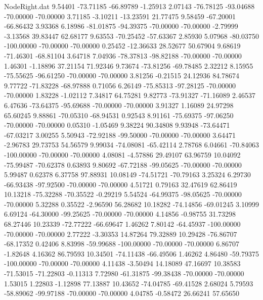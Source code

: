 \begin{filecontents}{NodeRight.dat}
   9.54401  -73.71185  -66.89789    -1.25913    2.07143  -76.78125  -93.04688  -70.00000  -70.00000    3.71185   -3.10211  -13.23591   21.77475
   9.58459  -67.20001  -66.86432     3.93368    6.18986  -81.01875  -94.39375  -70.00000  -70.00000   -2.79999   -3.13568   39.83447   62.68177
   9.63553  -70.25452  -57.63367     2.85930    5.07968  -80.03750 -100.00000  -70.00000  -70.00000    0.25452  -12.36633   28.52677   50.67904
   9.68619  -71.46301  -68.81104     3.64718    7.04936  -78.37813  -98.82188  -70.00000  -70.00000    1.46301   -1.18896   37.21154   71.92346
   9.73674  -73.81256  -69.78485     2.32212    8.15955  -75.55625  -96.61250  -70.00000  -70.00000    3.81256   -0.21515   24.12936   84.78674
   9.77722  -71.83228  -68.97888     0.71056    6.26149  -75.85313  -97.28125  -70.00000  -70.00000    1.83228   -1.02112    7.34817   64.75281
   9.82773  -73.91327  -71.16089     2.46537    6.47636  -73.64375  -95.69688  -70.00000  -70.00000    3.91327    1.16089   24.97298   65.60245
   9.88861  -70.05310  -68.94531     0.92543    8.91161  -75.69375  -97.06250  -70.00000  -70.00000    0.05310   -1.05469    9.38224   90.34808
   9.93948  -73.64471  -67.03217     3.00255    5.50943  -72.92188  -99.50000  -70.00000  -70.00000    3.64471   -2.96783   29.73753   54.56579
   9.99034  -74.08081  -65.42114     2.78768    6.04661  -70.84063 -100.00000  -70.00000  -70.00000    4.08081   -4.57886   29.49107   63.96759
  10.04092  -75.99487  -70.62378     0.63893    9.80692  -67.72188  -99.05625  -70.00000  -70.00000    5.99487    0.62378    6.37758   97.88931
  10.08149  -74.51721  -70.79163     3.25324    6.29730  -66.93438  -97.92500  -70.00000  -70.00000    4.51721    0.79163   32.47619   62.86419
  10.13218  -75.32288  -70.35522    -0.29219    5.54524  -64.99375  -98.05625  -70.00000  -70.00000    5.32288    0.35522   -2.96590   56.28682
  10.18282  -74.14856  -69.01245     3.10999    6.69124  -64.30000  -99.25625  -70.00000  -70.00000    4.14856   -0.98755   31.73298   68.27446
  10.23339  -72.77222  -66.69647     1.46262    7.80142  -64.45937 -100.00000  -70.00000  -70.00000    2.77222   -3.30353   14.87264   79.32889
  10.29428  -76.86707  -68.17352     0.42406    8.83998  -59.99688 -100.00000  -70.00000  -70.00000    6.86707   -1.82648    4.16362   86.79593
  10.34501  -74.11438  -66.49506     1.46262    4.86480  -59.79375 -100.00000  -70.00000  -70.00000    4.11438   -3.50494   14.18089   47.16697
  10.38583  -71.53015  -71.22803    -0.11313    7.72980  -61.31875  -99.38438  -70.00000  -70.00000    1.53015    1.22803   -1.12898   77.13887
  10.43652  -74.04785  -69.41528     2.68024    5.79593  -58.89062  -99.97188  -70.00000  -70.00000    4.04785   -0.58472   26.66241   57.65650

\end{filecontents}
